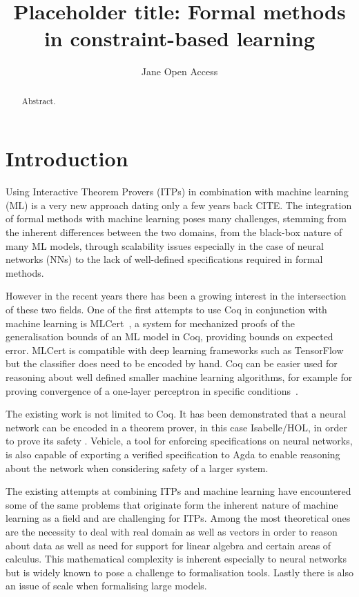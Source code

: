 \documentclass[a4paper,UKenglish,cleveref, autoref, thm-restate]{lipics-v2021}
\title{Placeholder title: Formal methods in constraint-based learning} %
\author{Jane {Open Access}}{Dummy University Computing Laboratory, [optional: Address], Country \and My second affiliation, Country \and \url{http://www.myhomepage.edu} }{johnqpublic@dummyuni.org}{https://orcid.org/0000-0002-1825-0097}{(Optional) author-specific funding acknowledgements}%
\begin{document}
\maketitle

\begin{abstract}
Abstract.
\end{abstract}


\section{Introduction}

Using Interactive Theorem Provers (ITPs) in combination with machine learning (ML) is a very new approach dating only a few years back CITE. 
The integration of formal methods with machine learning poses many challenges, stemming from the inherent differences between the two domains, from the black-box nature of many ML models, through scalability issues especially in the case of neural networks (NNs) to the lack of well-defined specifications required in formal methods. 

However in the recent years there has been a growing interest in the intersection of these two fields. One of the first attempts to use Coq in conjunction with machine learning is MLCert~\cite{bagnall2019certifying}, a system for mechanized proofs of the generalisation bounds of an ML model in Coq, providing bounds on expected error. MLCert is compatible with deep learning frameworks such as TensorFlow but the classifier does need to be encoded by hand. Coq can be easier used for reasoning about well defined smaller machine learning algorithms, for example for proving convergence of a one-layer perceptron in specific conditions~\cite{murphy2017verified}.

The existing work is not limited to Coq. It has been demonstrated that a neural network can be encoded in a theorem prover, in this case Isabelle/HOL, in order to prove its safety \cite{brucker2023verifying}. Vehicle, a tool for enforcing specifications on neural networks, is also capable of exporting a verified specification to Agda to enable reasoning about the network when considering safety of a larger system\cite{daggitt2023compiling}.

The existing attempts at combining ITPs and machine learning have encountered some of the same problems that originate form the inherent nature of machine learning as a field and are challenging for ITPs. Among the most theoretical ones are the necessity to deal with real domain as well as vectors in order to reason about data as well as need for support for linear algebra and certain areas of calculus. This mathematical complexity is inherent especially to neural networks but is widely known to pose a challenge to formalisation tools. Lastly there is also an issue of scale when formalising large models.
\end{document}

